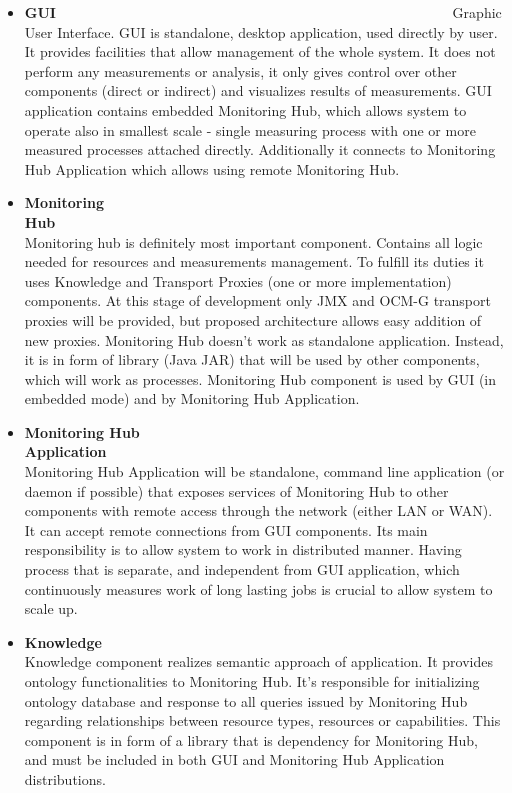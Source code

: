 \begin{itemize}

\item {\bf GUI}~~~~~~~~~~~~~~~~~~~~~~~~~~~~~~~~~~~~~~~~~~~~~~~~~~~~~~~~\linebreak
Graphic User Interface. GUI is standalone, desktop application, used directly by user. It provides facilities that allow management of the whole system. It does not perform any measurements or analysis, it only gives control over other components (direct or indirect) and visualizes results of measurements.
GUI application contains embedded Monitoring Hub, which allows system to operate also in smallest scale - single measuring process with one or more measured processes attached directly. Additionally it connects to Monitoring Hub Application which allows using remote Monitoring Hub.

\item {\bf Monitoring Hub}~~~~~~~~~~~~~~~~~~~~~~~~~~~~~~~~~~~~~~~~~~~~~~~~~~~~~~~~\linebreak
Monitoring hub is definitely most important component. Contains all logic needed for resources and measurements management. To fulfill its duties it uses Knowledge and Transport Proxies (one or more implementation) components. At this stage of development only JMX and OCM-G transport proxies will be provided, but proposed architecture allows easy addition of new proxies. 
Monitoring Hub doesn't work as standalone application. Instead, it is in form of library (Java JAR) that will be used by other components, which will work as processes. Monitoring Hub component is used by GUI (in embedded mode) and by Monitoring Hub Application.

\item {\bf Monitoring Hub Application}~~~~~~~~~~~~~~~~~~~~~~~~~~~~~~~~~~~~~~~~~~~~~~~~~~~~~~~~\linebreak
Monitoring Hub Application will be standalone, command line application (or daemon if possible) that exposes services of Monitoring Hub to other components with remote access through the network (either LAN or WAN). It can accept remote connections from GUI components.
Its main responsibility is to allow system to work in distributed manner. Having process that is separate, and independent from GUI application, which continuously measures work of long lasting jobs is crucial to allow system to scale up. 

\item {\bf Knowledge}~~~~~~~~~~~~~~~~~~~~~~~~~~~~~~~~~~~~~~~~~~~~~~~~~~~~~~~~\linebreak
Knowledge component realizes semantic approach of application. It provides ontology functionalities to Monitoring Hub. It's responsible for initializing ontology database and response to all queries issued by Monitoring Hub regarding relationships between resource types, resources or capabilities.
This component is in form of a library that is dependency for Monitoring Hub, and must be included in both GUI and Monitoring Hub Application distributions.


\end{itemize}
